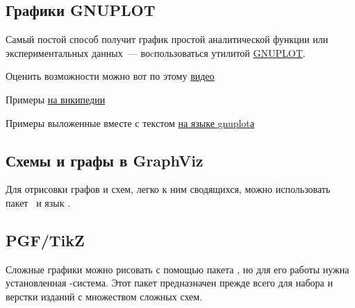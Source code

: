 \subsection{Графики GNUPLOT}

Самый постой способ получит график простой аналитической функции или
экспериментальных данных\ --- воcпользоваться утилитой
\href{http://gnuplot.info/}{GNUPLOT}.

\bigskip
Оценить возможности можно вот по этому
\href{http://upload.wikimedia.org/wikipedia/commons/b/b2/Gnuplot.ogv}{видео}

\bigskip
Примеры
\href{http://commons.wikimedia.org/wiki/Category:Gnuplot\_diagrams}{на
википедии}

\bigskip
Примеры выложенные вместе с текстом
\href{http://commons.wikimedia.org/wiki/Category:Images\_with\_Gnuplot\_source\_code}{на
языке gnuplotа}

\subsection{Схемы и графы в GraphViz}

Для отрисовки графов и схем, легко к ним сводящихся, можно использовать пакет
\ и язык . 

\subsection{PGF/TikZ}

Сложные графики можно рисовать с помощью пакета , но для его
работы нужна установленная \latex-система. Этот пакет предназначен прежде всего
для набора и верстки изданий с множеством сложных схем.


